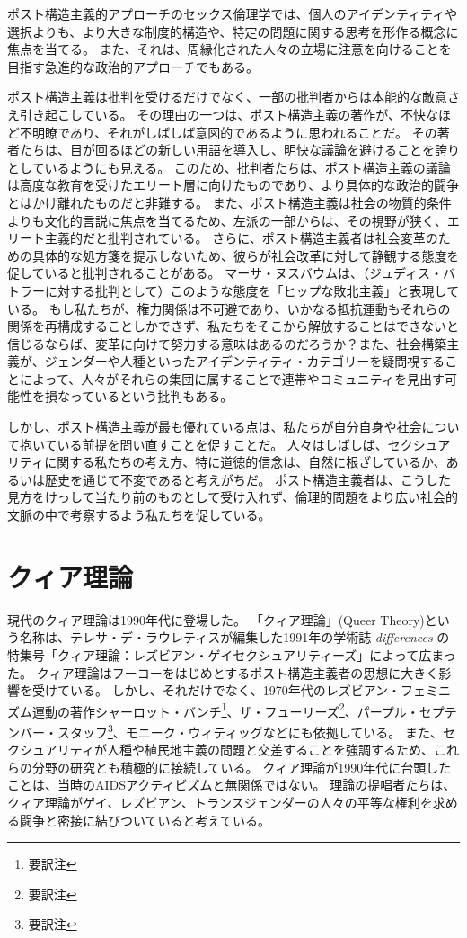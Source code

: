 \documentclass[paper=a4,book,openany]{jlreq} \usepackage{mystyle}
\begin{document}
ポスト構造主義的アプローチのセックス倫理学では、個人のアイデンティティや選択よりも、より大きな制度的構造や、特定の問題に関する思考を形作る概念に焦点を当てる。
また、それは、周縁化された人々の立場に注意を向けることを目指す急進的な政治的アプローチでもある。

ポスト構造主義は批判を受けるだけでなく、一部の批判者からは本能的な敵意さえ引き起こしている。
その理由の一つは、ポスト構造主義の著作が、不快なほど不明瞭であり、それがしばしば意図的であるように思われることだ。
その著者たちは、目が回るほどの新しい用語を導入し、明快な議論を避けることを誇りとしているようにも見える。
このため、批判者たちは、ポスト構造主義の議論は高度な教育を受けたエリート層に向けたものであり、より具体的な政治的闘争とはかけ離れたものだと非難する。
また、ポスト構造主義は社会の物質的条件よりも文化的言説に焦点を当てるため、左派の一部からは、その視野が狭く、エリート主義的だと批判されている。
さらに、ポスト構造主義者は社会変革のための具体的な処方箋を提示しないため、彼らが社会改革に対して静観する態度を促していると批判されることがある。
マーサ・ヌスバウムは、（ジュディス・バトラーに対する批判として）このような態度を「ヒップな敗北主義」と表現している\citep{nussbaum99:_profes_of_parody}。
もし私たちが、権力関係は不可避であり、いかなる抵抗運動もそれらの関係を再構成することしかできず、私たちをそこから解放することはできないと信じるならば、変革に向けて努力する意味はあるのだろうか？また、社会構築主義が、ジェンダーや人種といったアイデンティティ・カテゴリーを疑問視することによって、人々がそれらの集団に属することで連帯やコミュニティを見出す可能性を損なっているという批判もある。

しかし、ポスト構造主義が最も優れている点は、私たちが自分自身や社会について抱いている前提を問い直すことを促すことだ。
人々はしばしば、セクシュアリティに関する私たちの考え方、特に道徳的信念は、自然に根ざしているか、あるいは歴史を通じて不変であると考えがちだ。
ポスト構造主義者は、こうした見方をけっして当たり前のものとして受け入れず、倫理的問題をより広い社会的文脈の中で考察するよう私たちを促している。

\section{クィア理論}

現代のクィア理論は1990年代に登場した。
「クィア理論」(Queer Theory)という名称は、テレサ・デ・ラウレティスが編集した1991年の学術誌 \emph{differences} の特集号「クィア理論：レズビアン・ゲイセクシュアリティーズ」によって広まった\citep{lauretis91:_diff}。
クィア理論はフーコーをはじめとするポスト構造主義者の思想に大きく影響を受けている。
しかし、それだけでなく、1970年代のレズビアン・フェミニズム運動の著作{\DDASH}シャーロット・バンチ\footnote{要訳注}、ザ・フューリーズ\footnote{要訳注}、パープル・セプテンバー・スタッフ\footnote{要訳注}、モニーク・ウィティッグなど{\DDASH}にも依拠している。
また、セクシュアリティが人種や植民地主義の問題と交差することを強調するため、これらの分野の研究とも積極的に接続している。
クィア理論が1990年代に台頭したことは、当時のAIDSアクティビズムと無関係ではない。
理論の提唱者たちは、クィア理論がゲイ、レズビアン、トランスジェンダーの人々の平等な権利を求める闘争と密接に結びついていると考えている。
\end{document}
